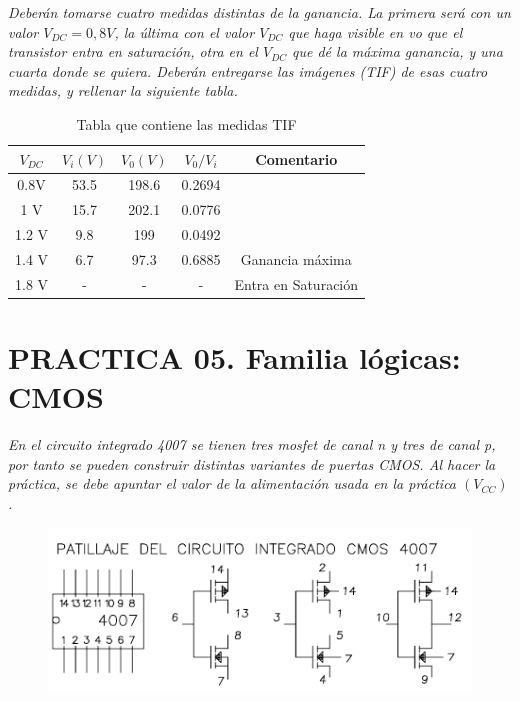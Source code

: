 \documentclass[paper=a4, fontsize=11pt]{scrartcl} %
\numberwithin{equation}{section} %
\numberwithin{figure}{section} %
\numberwithin{table}{section} %
\begin{document}
\textit{Deberán tomarse cuatro medidas distintas de la ganancia. La primera será con un valor $ V_{DC}=0,8V $, la última con el valor $ V_{DC} $ que haga visible en vo que el transistor entra en saturación, otra en el $ V_{DC} $ que dé la máxima ganancia, y una cuarta donde se quiera.
Deberán entregarse las imágenes (TIF) de esas cuatro medidas, y rellenar la siguiente tabla.} \newline

\begin{table}[H]
	\centering
	\begin{tabular}{|c|c|c|c|c|}
		\hline
		$ V_{DC} $ & $ V_{i}(V) $ & $ V_{0}(V) $ & $ V_{0}/V_{i} $ & Comentario \\
		\hline \hline
		0.8V & 53.5 & 198.6 & 0.2694 &  \\
		\hline
		1 V & 15.7 & 202.1 & 0.0776 &  \\
		\hline
		1.2 V & 9.8 & 199 & 0.0492 & \\
		\hline
		1.4 V & 6.7 & 97.3 & 0.6885 & Ganancia máxima \\
		\hline  
		1.8 V & - & - & - & Entra en Saturación \\
		\hline 
	\end{tabular}
	\caption{Tabla que contiene las medidas TIF}
	\label{fig:Tabla-prac-4B}
\end{table}

\newpage

\section{PRACTICA 05. Familia lógicas: CMOS}

\textit{En el circuito integrado 4007 se tienen tres mosfet de canal n y tres de canal p, por tanto se pueden construir distintas variantes de puertas CMOS. Al hacer la práctica, se debe apuntar el valor de la alimentación usada en la práctica $ (V_{CC}) $.}

\begin{figure}[H]
\centering
\includegraphics[width=0.7\linewidth]{image/p5a}
\end{figure}
\end{document}
